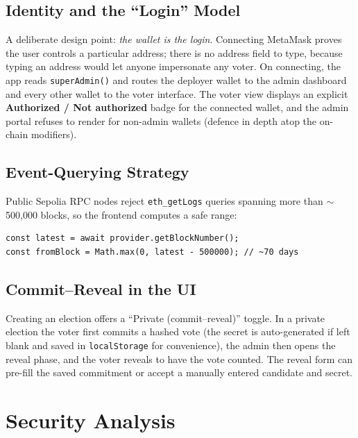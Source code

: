 \documentclass[11pt]{article}
\begin{document}
\subsection{Identity and the ``Login'' Model}
A deliberate design point: \emph{the wallet is the login}. Connecting MetaMask proves the
user controls a particular address; there is no address field to type, because typing an
address would let anyone impersonate any voter. On connecting, the app reads
\texttt{superAdmin()} and routes the deployer wallet to the admin dashboard and every other
wallet to the voter interface. The voter view displays an explicit
\textbf{Authorized / Not authorized} badge for the connected wallet, and the admin portal
refuses to render for non-admin wallets (defence in depth atop the on-chain modifiers).

\subsection{Event-Querying Strategy}
Public Sepolia RPC nodes reject \texttt{eth\_getLogs} queries spanning more than
$\sim$500{,}000 blocks, so the frontend computes a safe range:
\begin{lstlisting}[language=Solidity]
const latest = await provider.getBlockNumber();
const fromBlock = Math.max(0, latest - 500000); // ~70 days
\end{lstlisting}

\subsection{Commit--Reveal in the UI}
Creating an election offers a ``Private (commit--reveal)'' toggle. In a private election the
voter first commits a hashed vote (the secret is auto-generated if left blank and saved in
\texttt{localStorage} for convenience), the admin then opens the reveal phase, and the voter
reveals to have the vote counted. The reveal form can pre-fill the saved commitment or accept
a manually entered candidate and secret.

\section{Security Analysis}
\end{document}

